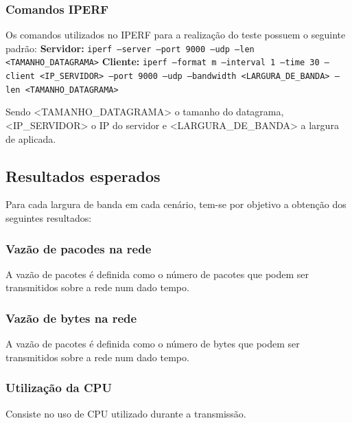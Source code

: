 \documentclass[12pt]{article}
\begin{document}
\subsubsection{Comandos IPERF}

Os comandos utilizados no IPERF para a realização do teste possuem o seguinte padrão:
\newline
\newline
\textbf{Servidor:}
\newline
\texttt{iperf --server --port 9000 --udp --len <TAMANHO\_DATAGRAMA>}
\newline
\newline
\textbf{Cliente:}
\newline
\texttt{iperf --format m --interval 1 --time 30 --client <IP\_SERVIDOR> --port 9000 --udp --bandwidth <LARGURA\_DE\_BANDA> --len <TAMANHO\_DATAGRAMA>}
\newline

Sendo <TAMANHO\_DATAGRAMA> o tamanho do datagrama, <IP\_SERVIDOR> o IP do servidor e <LARGURA\_DE\_BANDA> a largura de aplicada.

\subsection{Resultados esperados}

Para cada largura de banda em cada cenário, tem-se por objetivo a obtenção dos seguintes resultados:

\subsubsection{Vazão de pacodes na rede}

A vazão de pacotes é definida como o número de pacotes que podem ser transmitidos sobre a rede num dado tempo.

\subsubsection{Vazão de bytes na rede}

A vazão de pacotes é definida como o número de bytes que podem ser transmitidos sobre a rede num dado tempo.

\subsubsection{Utilização da CPU}

Consiste no uso de CPU utilizado durante a transmissão.
\end{document}
